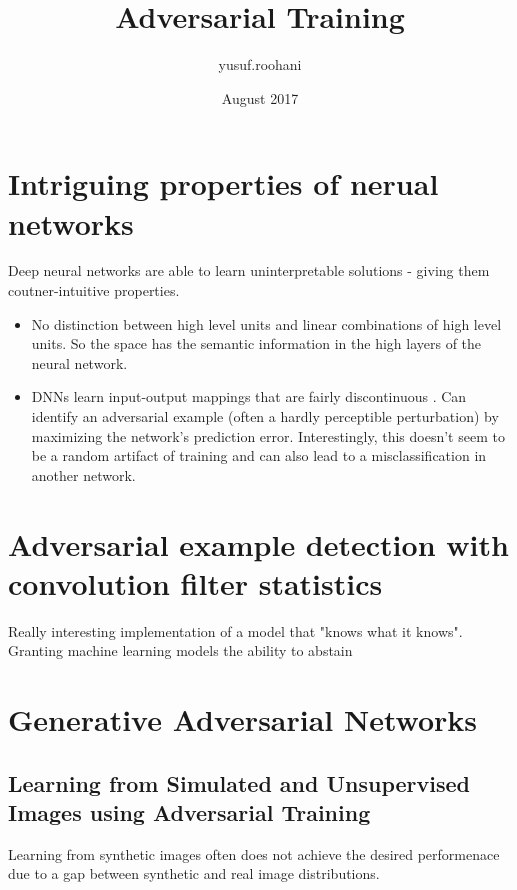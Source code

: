 \documentclass{article}
\title{Adversarial Training}
\author{yusuf.roohani }
\date{August 2017}
\begin{document}
\maketitle

\section{Intriguing properties of nerual networks \cite{DBLP:journals/corr/SzegedyZSBEGF13}}

Deep neural networks are able to learn uninterpretable solutions - giving them coutner-intuitive properties. 
\begin{itemize}
    \item No distinction between high level units and linear combinations of high level units. So the space has the semantic information in the high layers of the neural network.
    
    \item DNNs learn input-output mappings that are fairly discontinuous . Can identify an adversarial example (often a hardly perceptible perturbation) by maximizing the network's prediction error. Interestingly, this doesn't seem to be a random artifact of training and can also lead to a misclassification in another network.
\end{itemize}

\section{Adversarial example detection with convolution filter statistics \cite{DBLP:journals/corr/LiL16e}}

Really interesting implementation of a model that "knows what it knows". Granting machine learning models the ability to abstain

\section{Generative Adversarial Networks}

\subsection{Learning from Simulated and Unsupervised Images using Adversarial Training \cite{shrivastava2016learning}} 

Learning from synthetic images often does not achieve the desired performenace due to a gap between synthetic and real image distributions. 
\end{document}
